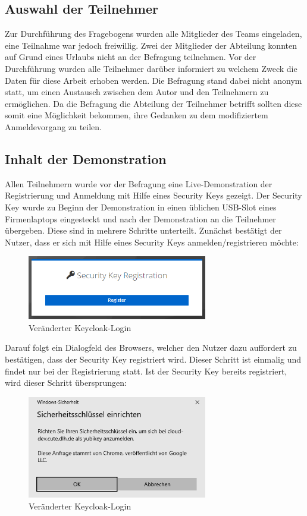 \subsection{Auswahl der Teilnehmer}
Zur Durchführung des Fragebogens wurden alle Mitglieder des Teams eingeladen, eine Teilnahme war jedoch freiwillig. Zwei der Mitglieder der Abteilung konnten auf Grund eines Urlaubs nicht an der Befragung teilnehmen. Vor der Durchführung wurden alle Teilnehmer darüber informiert zu welchem Zweck die Daten für diese Arbeit erhoben werden. Die Befragung stand dabei nicht anonym statt, um einen Austausch zwischen dem Autor und den Teilnehmern zu ermöglichen. Da die Befragung die Abteilung der Teilnehmer betrifft sollten diese somit eine Möglichkeit bekommen, ihre Gedanken zu dem modifiziertem Anmeldevorgang zu teilen.

\subsection{Inhalt der Demonstration}
Allen Teilnehmern wurde vor der Befragung eine Live-Demonstration der Registrierung und Anmeldung mit Hilfe eines Security Keys gezeigt. Der Security Key wurde zu Beginn der Demonstration in einen üblichen USB-Slot eines Firmenlaptops eingesteckt und nach der Demonstration an die Teilnehmer übergeben. Diese sind in mehrere Schritte unterteilt. Zunächst bestätigt der Nutzer, dass er sich mit Hilfe eines Security Keys anmelden/registrieren möchte:

\begin{figure}[h]
	\centering 
	\includegraphics[width=0.7\textwidth]{img/abbildungen/reg001.png}
	\captionsetup{format=hang}
	\caption{Veränderter Keycloak-Login}
\end{figure}

Darauf folgt ein Dialogfeld des Browsers, welcher den Nutzer dazu auffordert zu bestätigen, dass der Security Key registriert wird. Dieser Schritt ist einmalig und findet nur bei der Registrierung statt. Ist der Security Key bereits registriert, wird dieser Schritt übersprungen:

\begin{figure}[h]
	\centering 
	\includegraphics[width=0.7\textwidth]{img/abbildungen/reg002.png}
	\captionsetup{format=hang}
	\caption{Veränderter Keycloak-Login}
\end{figure}

